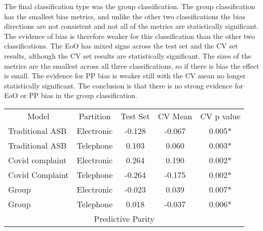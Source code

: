 The final classification type was the group classification. The group classification has the smallest bias metrics, and unlike the other two classifications the bias directions are not consistent and not all of the metrics are statistically significant. The evidence of bias is therefore weaker for this classification than the other two classifications. The EoO has mixed signs across the test set and the CV set results, although the CV set results are statistically significant. The sizes of the metrics are the smallest across all three classifications, so if there is bias the effect is small. The evidence for PP bias is weaker still with the CV mean no longer statistically significant. The conclusion is that there is no strong evidence for EoO or PP bias in the group classification. 


\begin{table}[]
\centering
\begin{tabular}{@{}llccc@{}}
\toprule
\rowcolor[HTML]{BFBFBF} 
\multicolumn{5}{c}{\cellcolor[HTML]{BFBFBF}Equality Of Outcome}                                                                             \\ \midrule

\multicolumn{1}{c}{Model} & \multicolumn{1}{c}{Partition} & Test Set & CV Mean & CV p value \\ \midrule
Traditional ASB                                   & Electronic                                            & -0.128   & -0.067  & 0.005*      \\
Traditional ASB                                   & Telephone                                             & 0.103    & 0.060   & 0.003*      \\
Covid complaint                                   & Electronic                                            & 0.264    & 0.190   & 0.002*      \\
Covid Complaint                                   & Telephone                                             & -0.264   & -0.175  & 0.002*      \\
Group                                        & Electronic                                            & -0.023   & 0.039   & 0.007*      \\
Group                                         & Telephone                                             & 0.018    & -0.037  & 0.006*      \\ \midrule
\multicolumn{5}{c}{\cellcolor[HTML]{BFBFBF}Predictive Parity}                                                                                                       \\ \midrule


\end{tabular}
\end{table}
